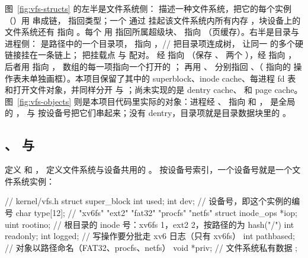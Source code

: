 图~\ref{fig:vfs-structs} 的左半是文件系统侧： 描述一种文件系统，把它的每个实例（）用  串成链， 指回类型；一个  通过  挂起该文件系统内所有内存 ，块设备上的文件系统还有  指向 。每个  用  指回所属超级块、 指向 （页缓存）。右半是目录与进程侧： 是路径中的一个目录项， 指向 ，// 把目录项连成树， 让同一  的多个硬链接挂在一条链上； 把挂载点  与  配对。 经  指向 （保存 、 两个 ），经  指向 ，后者用  指向 ， 数组的每一项指向一个打开的 ； 再用 、 分别指回 、（ 指向的  操作表未单独画框）。本项目保留了其中的 superblock、inode cache、每进程 fd 表和打开文件对象，并同样分开  与 ；尚未实现的是 dentry cache、 和 page cache。图~\ref{fig:vfs-objects} 则是本项目代码里实际的对象：进程经 、 指向  和 ， 是全局的 \code{/}， 与  按设备号把它们串起来；没有 dentry，目录项就是目录数据块里的 。

\subsection{、 与 }

 定义  和 ， 定义文件系统与设备共用的 。 按设备号索引，一个设备号就是一个文件系统实例：

\begin{ccode}
// kernel/vfs.h
struct super_block {
  int    used;
  int    dev;          // 设备号，即这个实例的编号
  char   type[12];     // "xv6fs" "ext2" "fat32" "procfs" "netfs"
  struct inode_ops *iop;
  uint   rootino;      // 根目录的 inode 号：xv6fs 1，ext2 2，按路径的为 hash("/")
  int    readonly;
  int    logged;       // 写操作要分批走 xv6 日志（只有 xv6fs）
  int    pathbased;    // 对象以路径命名（FAT32、procfs、netfs）
  void   *priv;        // 文件系统私有数据
};
\end{ccode}

